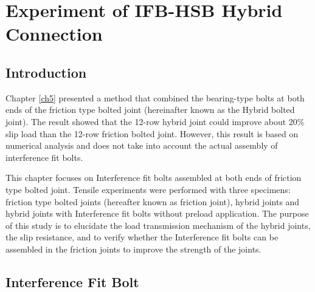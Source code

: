 \chapter{Experiment of IFB-HSB Hybrid Connection}
\label{ch6}

\begin{spacing}{1.25} %
\minitoc %
\end{spacing} %
\onehalfspacing %

\section{Introduction}

Chapter \ref{ch5} presented a method that combined the bearing-type bolts at both ends of the friction type bolted joint (hereinafter known as the Hybrid bolted joint). The result showed that the 12-row hybrid joint could improve about 20\% slip load than the 12-row friction bolted joint. However, this result is based on numerical analysis and does not take into account the actual assembly of interference fit bolts.

This chapter focuses on Interference fit bolts assembled at both ends of friction type bolted joint. Tensile  experiments  were performed with three specimens: friction type bolted joints (hereafter known as friction joint), hybrid joints and hybrid joints with Interference fit bolts without preload application. The purpose of this study is to elucidate the load transmission mechanism of the hybrid joints, the slip resistance, and to verify whether the Interference fit bolts can be assembled in the friction joints to improve the strength of the joints.


\section{Interference Fit Bolt}

